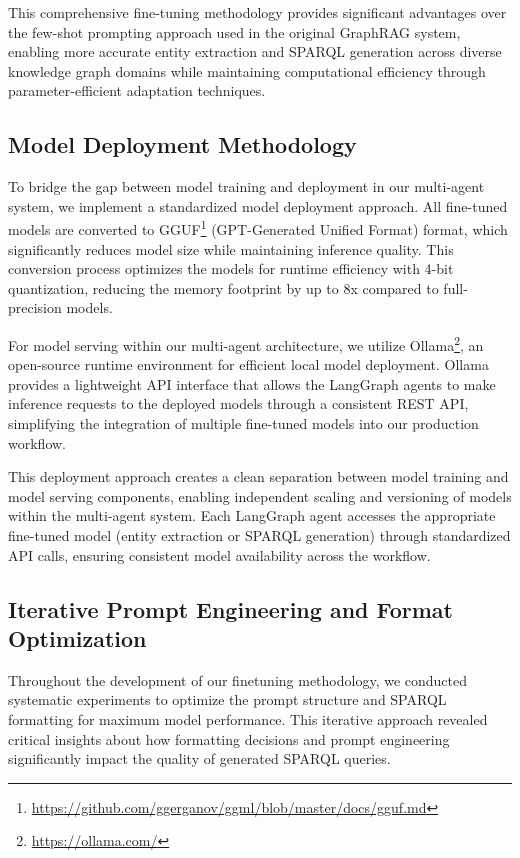 This comprehensive fine-tuning methodology provides significant advantages over the few-shot prompting approach used in the original GraphRAG system, enabling more accurate entity extraction and SPARQL generation across diverse knowledge graph domains while maintaining computational efficiency through parameter-efficient adaptation techniques.

\subsection{Model Deployment Methodology}
To bridge the gap between model training and deployment in our multi-agent system, we implement a standardized model deployment approach. All fine-tuned models are converted to GGUF\footnote{\url{https://github.com/ggerganov/ggml/blob/master/docs/gguf.md}} (GPT-Generated Unified Format) format, which significantly reduces model size while maintaining inference quality. This conversion process optimizes the models for runtime efficiency with 4-bit quantization, reducing the memory footprint by up to 8x compared to full-precision models.

For model serving within our multi-agent architecture, we utilize Ollama\footnote{\url{https://ollama.com/}}, an open-source runtime environment for efficient local model deployment. Ollama provides a lightweight API interface that allows the LangGraph agents to make inference requests to the deployed models through a consistent REST API, simplifying the integration of multiple fine-tuned models into our production workflow.

This deployment approach creates a clean separation between model training and model serving components, enabling independent scaling and versioning of models within the multi-agent system. Each LangGraph agent accesses the appropriate fine-tuned model (entity extraction or SPARQL generation) through standardized API calls, ensuring consistent model availability across the workflow.



\subsection{Iterative Prompt Engineering and Format Optimization}
\label{iterative-prompt}

Throughout the development of our finetuning methodology, we conducted systematic experiments to optimize the prompt structure and SPARQL formatting for maximum model performance. This iterative approach revealed critical insights about how formatting decisions and prompt engineering significantly impact the quality of generated SPARQL queries.

